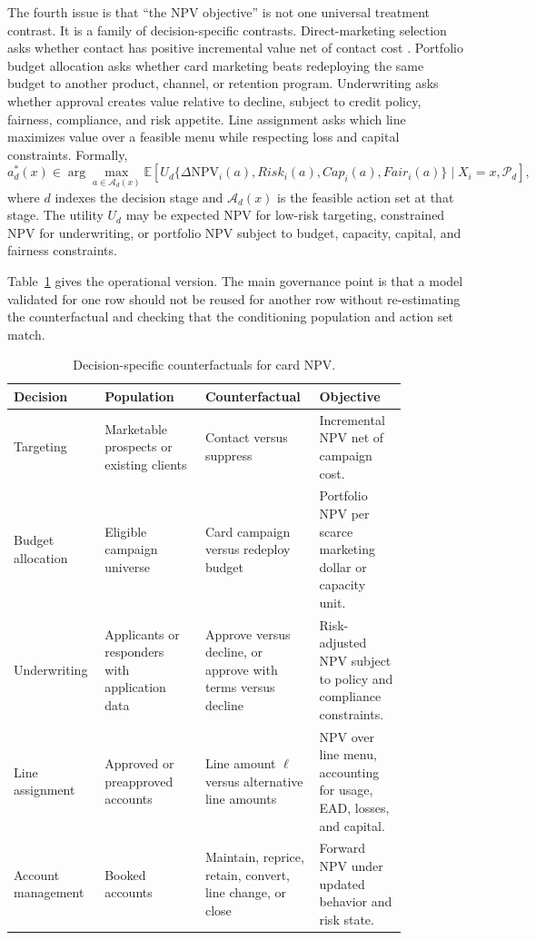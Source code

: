 \documentclass[11pt]{article}
\newcommand{\E}{\mathbb{E}}
\newcommand{\NPV}{\mathrm{NPV}}
\newcommand{\1}{\mathbf{1}}
\begin{document}
The fourth issue is that ``the NPV objective'' is not one universal treatment
contrast. It is a family of decision-specific contrasts. Direct-marketing
selection asks whether contact has positive incremental value net of contact
cost \citep{bult1995directmail}. Portfolio budget allocation asks whether card
marketing beats redeploying the same budget to another product, channel, or
retention program. Underwriting asks whether approval creates value relative to
decline, subject to credit policy, fairness, compliance, and risk appetite.
Line assignment asks which line maximizes value over a feasible menu while
respecting loss and capital constraints. Formally,
\begin{equation}
  a_d^*(x)
  \in
  \arg\max_{a\in\mathcal{A}_d(x)}
  \E[
    U_d\{\Delta \NPV_i(a),Risk_i(a),Cap_i(a),Fair_i(a)\}
    \mid X_i=x,\mathcal{P}_d
  ],
  \label{eq:decision-specific-policy}
\end{equation}
where $d$ indexes the decision stage and $\mathcal{A}_d(x)$ is the feasible
action set at that stage. The utility $U_d$ may be expected NPV for low-risk
targeting, constrained NPV for underwriting, or portfolio NPV subject to budget,
capacity, capital, and fairness constraints.

Table~\ref{tab:decision-estimands} gives the operational version. The main
governance point is that a model validated for one row should not be reused for
another row without re-estimating the counterfactual and checking that the
conditioning population and action set match.

\begin{table}[t]
\centering
\caption{Decision-specific counterfactuals for card NPV.}
\label{tab:decision-estimands}
\begin{tabular}{p{0.17\linewidth}p{0.24\linewidth}p{0.24\linewidth}p{0.21\linewidth}}
\toprule
Decision & Population & Counterfactual & Objective \\
\midrule
Targeting
  & Marketable prospects or existing clients
  & Contact versus suppress
  & Incremental NPV net of campaign cost. \\
Budget allocation
  & Eligible campaign universe
  & Card campaign versus redeploy budget
  & Portfolio NPV per scarce marketing dollar or capacity unit. \\
Underwriting
  & Applicants or responders with application data
  & Approve versus decline, or approve with terms versus decline
  & Risk-adjusted NPV subject to policy and compliance constraints. \\
Line assignment
  & Approved or preapproved accounts
  & Line amount $\ell$ versus alternative line amounts
  & NPV over line menu, accounting for usage, EAD, losses, and capital. \\
Account management
  & Booked accounts
  & Maintain, reprice, retain, convert, line change, or close
  & Forward NPV under updated behavior and risk state. \\
\bottomrule
\end{tabular}
\end{table}
\end{document}
